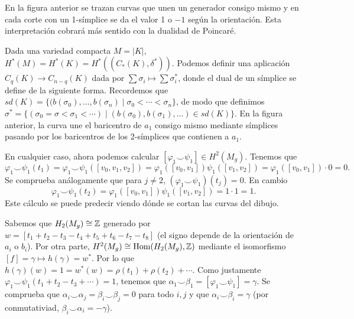 \documentclass[TA.tex]{subfiles}
\begin{document}
\begin{ej}
En la figura anterior se trazan curvas que unen un generador consigo mismo y en cada corte con un 1-símplice se da el valor 1 o $-1$ según la orientación. Esta interpretación cobrará más sentido con la dualidad de Poincaré.

Dada una variedad compacta $M=|K|$, $H^*(M)=H^*(K)=H^*((C_*(K),\delta^*))$. Podemos definir una aplicación $C_q(K)\to C_{n-q}(K)$ dada por $\sum\sigma_i\mapsto \sum\sigma_i^*$, donde el dual de un símplice se define de la siguiente forma. Recordemos que $sd(K)=\{(b(\sigma_0),\dots, b(\sigma_n)\mid \sigma_0<\cdots<\sigma_n\}$, de modo que definimos $\sigma^*=\{(\sigma_0=\sigma<\sigma_1<\cdots)\mid (b(\sigma_0),b(\sigma_1),\dots)\in sd(K)\}$. En la figura anterior, la curva une el baricentro de $a_1$ consigo mismo mediante símplices pasando por los baricentros de los 2-símplices que contienen a $a_1$.  


En cualquier caso, ahora podemos calcular $[\varphi_1\smile \psi_1]\in H^2(M_g)$. Tenemos que $$\varphi_1\smile\psi_1(t_1)=\varphi_1\smile\psi_1([v_0,v_1,v_2])=\varphi_1([v_0,v_1])\psi_1([v_1,v_2])=\varphi_1([v_0,v_1])\cdot 0=0.$$ Se comprueba análogamente que para $j\neq 2$, $(\varphi_1\smile \psi_1)(t_j)=0$. En cambio $$\varphi_1\smile\psi_1(t_2)=\varphi_1([v_0,v_1])\psi_1([v_1,v_2])=1\cdot 1=1.$$ Este cálculo se puede predecir viendo dónde se cortan las curvas del dibujo.

 Sabemos que $H_2(M_g)\cong\mathbb{Z}$ generado por $w=[t_1+t_2-t_3-t_4+t_5+t_6-t_7-t_8]$ (el signo depende de la orientación de $a_i$ o $b_i$). Por otra parte, $H^2(M_g)\cong \operatorname{Hom}(H_2(M_g),\mathbb{Z})$ mediante el isomorfismo $[f]=\gamma\mapsto h(\gamma)=w^*$. Por lo que $h(\gamma)(w)=1=w^*(w)=\rho(t_1)+\rho(t_2)+\cdots$. Como justamente $\varphi_1\smile\psi_1(t_1+t_2-t_3+\cdots)=1$, tenemos que $\alpha_1\smile\beta
 _1=[\varphi_1\smile\psi_1]=\gamma$. Se comprueba que $\alpha_i\smile\alpha_j=\beta_i\smile\beta_j=0$ para todo $i,j$ y que $\alpha_i\smile\beta_i=\gamma$ (por conmutativiad, $\beta_i\smile\alpha_i=-\gamma$). 


\end{ej}
\end{document}

